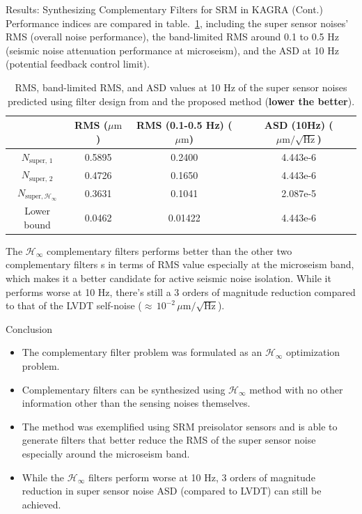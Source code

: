 \documentclass{beamer}
\begin{document}
\begin{frame}[t]
\begin{columns}[t]
\begin{column}{0.32\linewidth}
\begin{block}{Results: Synthesizing Complementary Filters for SRM in KAGRA (Cont.)}
			Performance indices are compared in table.~\ref{table:metrics}, including the super sensor noises' RMS (overall noise performance), the band-limited RMS around 0.1 to 0.5 Hz (seismic noise attenuation performance at microseism), and the ASD at 10 Hz (potential feedback control limit).
			\begin{table}
				\begin{tabular}{|c|c|c|c|}
					\hline
					& RMS ($\mu\text{m}$) & RMS (0.1-0.5 Hz) ($\mu\text{m}$)& ASD (10Hz) ($\mu\text{m}/\sqrt{\text{Hz}}$)\\
					\hline
					$N_\text{super, 1}$ & 0.5895 & 0.2400 & 4.443e-6\\
					\hline
					$N_\text{super, 2}$ & 0.4726 & 0.1650 & 4.443e-6\\
					\hline
					$N_{\text{super}, \mathcal{H}_\infty}$ & 0.3631 & 0.1041 & 2.087e-5\\
					\hline
					Lower bound & 0.0462 & 0.01422 & 4.443e-6\\
					\hline
				\end{tabular}
				\caption{RMS, band-limited RMS, and ASD values at 10 Hz of the super sensor noises predicted using filter design from \cite{Sekiguchi:2016bmv,vanHeijningen:2018cpc} and the proposed method (\textbf{lower the better}).}
				\label{table:metrics}
			\end{table}
			The $\mathcal{H}_\infty$ complementary filters performs better than the other two complementary filters s in terms of RMS value especially at the microseism band, which makes it a better candidate for active seismic noise isolation.
			While it performs worse at 10 Hz, there's still a 3 orders of magnitude reduction compared to that of the LVDT self-noise ($\approx\, 10^{-2}\,\mu\text{m}/\sqrt{\text{Hz}}$).
			\end{block}
			\begin{block}{Conclusion}
				\begin{itemize}
					\item The complementary filter problem was formulated as an $\mathcal{H}_\infty$ optimization problem.
					\item Complementary filters can be synthesized using $\mathcal{H}_\infty$ method with no other information other than the sensing noises themselves.
					\item The method was exemplified using SRM preisolator sensors and is able to generate filters that better reduce the RMS of the super sensor noise especially around the microseism band.
					\item While the $\mathcal{H}_\infty$ filters perform worse at 10 Hz, 3 orders of magnitude reduction in super sensor noise ASD (compared to LVDT) can still be achieved.

\end{itemize}
\end{block}
\end{column}
\end{columns}
\end{frame}
\end{document}
